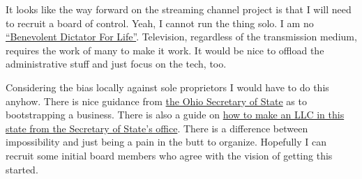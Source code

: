 It looks like the way forward on the streaming channel project is that I
will need to recruit a board of control. Yeah, I cannot run the thing
solo. I am no
\href{https://en.wikipedia.org/wiki/Benevolent_dictator_for_life}{``Benevolent
Dictator For Life''}. Television, regardless of the transmission medium,
requires the work of many to make it work. It would be nice to offload
the administrative stuff and just focus on the tech, too.

Considering the bias locally against sole proprietors I would have to do
this anyhow. There is nice guidance from
\href{https://www.ohiosos.gov/businesses/information-on-starting-and-maintaining-a-business/starting-a-business/}{the
Ohio Secretary of State} as to bootstrapping a business. There is also a
guide on
\href{https://www.ohiosos.gov/globalassets/publications/busserv/llc.pdf}{how
to make an LLC in this state from the Secretary of State's office}.
There is a difference between impossibility and just being a pain in the
butt to organize. Hopefully I can recruit some initial board members who
agree with the vision of getting this started.

